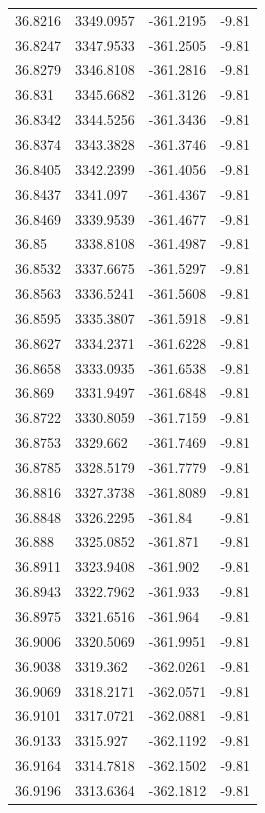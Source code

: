 \begin{table}[H]
\begin{tabular}{llll}
36.8216 & 3349.0957 & -361.2195 & -9.81 \\
36.8247 & 3347.9533 & -361.2505 & -9.81 \\
36.8279 & 3346.8108 & -361.2816 & -9.81 \\
36.831 & 3345.6682 & -361.3126 & -9.81 \\
36.8342 & 3344.5256 & -361.3436 & -9.81 \\
36.8374 & 3343.3828 & -361.3746 & -9.81 \\
36.8405 & 3342.2399 & -361.4056 & -9.81 \\
36.8437 & 3341.097 & -361.4367 & -9.81 \\
36.8469 & 3339.9539 & -361.4677 & -9.81 \\
36.85 & 3338.8108 & -361.4987 & -9.81 \\
36.8532 & 3337.6675 & -361.5297 & -9.81 \\
36.8563 & 3336.5241 & -361.5608 & -9.81 \\
36.8595 & 3335.3807 & -361.5918 & -9.81 \\
36.8627 & 3334.2371 & -361.6228 & -9.81 \\
36.8658 & 3333.0935 & -361.6538 & -9.81 \\
36.869 & 3331.9497 & -361.6848 & -9.81 \\
36.8722 & 3330.8059 & -361.7159 & -9.81 \\
36.8753 & 3329.662 & -361.7469 & -9.81 \\
36.8785 & 3328.5179 & -361.7779 & -9.81 \\
36.8816 & 3327.3738 & -361.8089 & -9.81 \\
36.8848 & 3326.2295 & -361.84 & -9.81 \\
36.888 & 3325.0852 & -361.871 & -9.81 \\
36.8911 & 3323.9408 & -361.902 & -9.81 \\
36.8943 & 3322.7962 & -361.933 & -9.81 \\
36.8975 & 3321.6516 & -361.964 & -9.81 \\
36.9006 & 3320.5069 & -361.9951 & -9.81 \\
36.9038 & 3319.362 & -362.0261 & -9.81 \\
36.9069 & 3318.2171 & -362.0571 & -9.81 \\
36.9101 & 3317.0721 & -362.0881 & -9.81 \\
36.9133 & 3315.927 & -362.1192 & -9.81 \\
36.9164 & 3314.7818 & -362.1502 & -9.81 \\
36.9196 & 3313.6364 & -362.1812 & -9.81 \\

\end{tabular}
\end{table}
